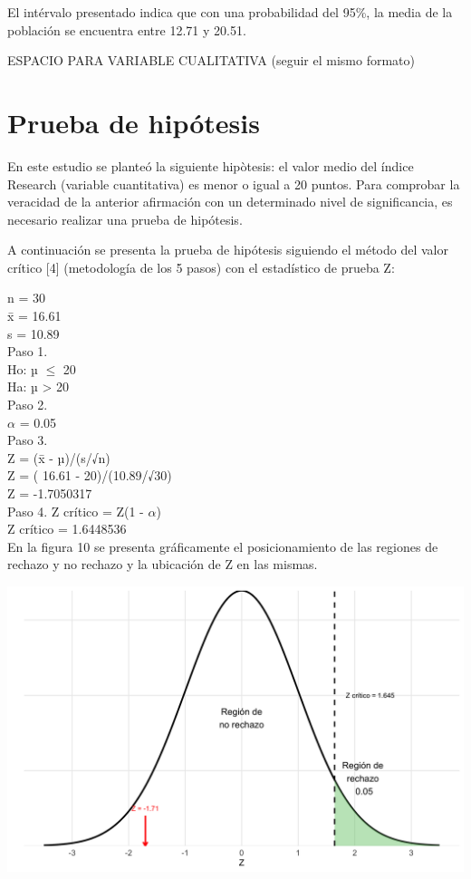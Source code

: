 \documentclass[
]{article}
\begin{document}
\begin{multicols}{2}
El intérvalo presentado indica que con una probabilidad del 95\%, la media de la población se encuentra entre 12.71 y 20.51.

ESPACIO PARA VARIABLE CUALITATIVA (seguir el mismo formato)

\section{Prueba de hipótesis}



En este estudio se planteó la siguiente hipòtesis: el valor medio del índice Research (variable cuantitativa) es menor o igual a 20 puntos. Para comprobar la veracidad de la anterior afirmación con un determinado nivel de significancia, es necesario realizar una prueba de hipótesis.

A continuación se presenta la prueba de hipótesis siguiendo el método del valor crítico [4] (metodología de los 5 pasos) con el estadístico de prueba Z:

n = 30\\
x̄ = 16.61\\
s =  10.89\\

Paso 1.\\
Ho: µ $≤$ 20\\
Ha: µ > 20\\

Paso 2.\\
$\alpha$ = 0.05\\

Paso 3.\\
Z = (x̄ - µ)/(s/√n)\\
Z = ( 16.61 - 20)/(10.89/√30)\\
Z = -1.7050317\\

Paso 4.
Z crítico = Z(1 - $\alpha$)\\
Z crítico = 1.6448536\\

En la figura 10 se presenta gráficamente el posicionamiento de las regiones de rechazo y no rechazo y la ubicación de Z en las mismas.


\begin{center}
\includegraphics[width=\linewidth]{figura10.png}
\end{center}


\end{multicols}
\end{document}
